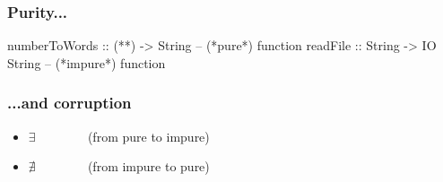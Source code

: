 \documentclass[17pt]{beamer}
\renewcommand{\(}[1]{\begin{columns}[#1]}
\renewcommand{\)}{\end{columns}}
\newcommand{\<}[1]{\begin{column}{#1}}
\renewcommand{\>}{\end{column}}
\begin{document}
\begin{frame}[fragile]
  \frametitle{Purity...}
  \begin{code}
numberToWords :: (**) -> String  -- (*\color{google-r}pure*) function
readFile :: String -> IO String -- (*\color{google-r}impure*) function
  \end{code}
\end{frame}

\begin{frame}[fragile]
  \frametitle{...and corruption}
  \begin{itemize}
    \item $\exists$ ~~ ~~~~~{\small (from pure to impure)}
    \item $\nexists$ ~~ ~~~~~{\small (from impure to pure)}
  \end{itemize}
  \begin{center}
    \\
  \end{center}
\end{frame}
\end{document}
